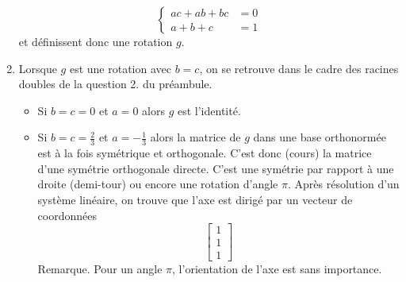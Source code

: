 \begin{enumerate}
\begin{displaymath}
 \left\lbrace 
\begin{aligned}
ac +ab+bc &= 0 \\
a+b+c &= 1
\end{aligned}
\right. 
\end{displaymath}
et définissent donc une rotation $g$.
\item Lorsque $g$ est une rotation avec $b=c$, on se retrouve dans le cadre des racines doubles de la question 2. du préambule.
\begin{itemize}
 \item Si $b=c=0$ et $a=0$ alors $g$ est l'identité.
\item Si $b=c=\frac{2}{3}$  et $a=-\frac{1}{3}$ alors la matrice de $g$ dans une base orthonormée est à la fois symétrique et orthogonale. C'est donc (cours) la matrice d'une symétrie orthogonale directe. C'est une symétrie par rapport à une droite (demi-tour) ou encore une rotation d'angle $\pi$. Après résolution d'un système linéaire, on trouve que l'axe est dirigé par un vecteur de coordonnées
\begin{displaymath}
 \begin{bmatrix}
  1 \\ 1 \\ 1
 \end{bmatrix}
\end{displaymath}
Remarque. Pour un angle $\pi$, l'orientation de l'axe est sans importance.
\end{itemize}
\end{enumerate}

